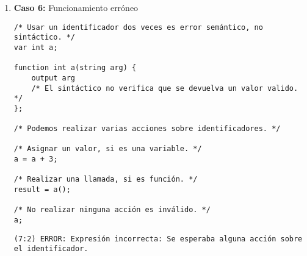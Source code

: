 \begin{enumerate}
    \begin{tcolorbox}[title={Errores detectados}, colback=white]
        \begin{lstlisting}
(5:9) ERROR: Una variable no puede ser de tipo «void».
        \end{lstlisting}
    \end{tcolorbox}

    
    \item \textbf{Caso 6:} Funcionamiento erróneo
    \begin{tcolorbox}[title={Código fuente}, colback=white, breakable]
        \begin{lstlisting}
/* Usar un identificador dos veces es error semántico, no sintáctico. */
var int a;

function int a(string arg) {
    output arg
    /* El sintáctico no verifica que se devuelva un valor valido. */
};

/* Podemos realizar varias acciones sobre identificadores. */

/* Asignar un valor, si es una variable. */
a = a + 3;

/* Realizar una llamada, si es función. */
result = a();

/* No realizar ninguna acción es inválido. */
a;
        \end{lstlisting}      
    \end{tcolorbox}

    \begin{tcolorbox}[title={Errores detectados}, colback=white]
        \begin{lstlisting}
(7:2) ERROR: Expresión incorrecta: Se esperaba alguna acción sobre el identificador.
        \end{lstlisting}
    \end{tcolorbox}

\end{enumerate}
